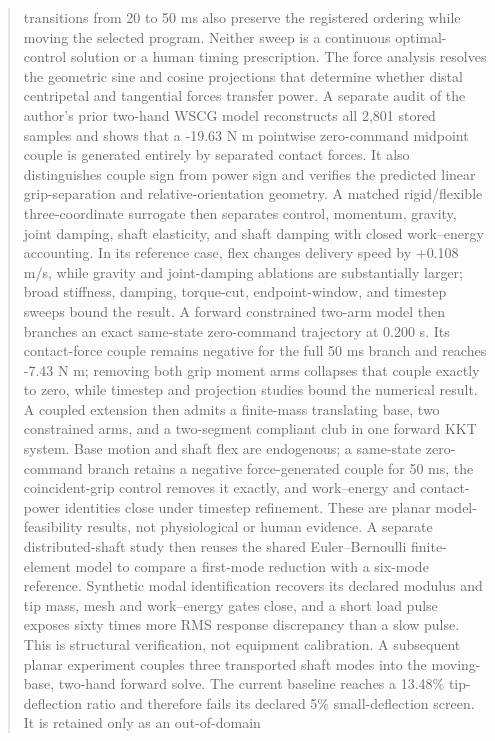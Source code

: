 \documentclass[
  letterpaper,
]{report}
\begin{document}
\begin{abstract}
transitions from 20 to 50 ms also preserve the registered ordering while
moving the selected program. Neither sweep is a continuous
optimal-control solution or a human timing prescription. The force
analysis resolves the geometric sine and cosine projections that
determine whether distal centripetal and tangential forces transfer
power. A separate audit of the author's prior two-hand WSCG model
reconstructs all 2,801 stored samples and shows that a -19.63 N m
pointwise zero-command midpoint couple is generated entirely by
separated contact forces. It also distinguishes couple sign from power
sign and verifies the predicted linear grip-separation and
relative-orientation geometry. A matched rigid/flexible three-coordinate
surrogate then separates control, momentum, gravity, joint damping,
shaft elasticity, and shaft damping with closed work--energy accounting.
In its reference case, flex changes delivery speed by +0.108 m/s, while
gravity and joint-damping ablations are substantially larger; broad
stiffness, damping, torque-cut, endpoint-window, and timestep sweeps
bound the result. A forward constrained two-arm model then branches an
exact same-state zero-command trajectory at 0.200 s. Its contact-force
couple remains negative for the full 50 ms branch and reaches -7.43 N m;
removing both grip moment arms collapses that couple exactly to zero,
while timestep and projection studies bound the numerical result. A
coupled extension then admits a finite-mass translating base, two
constrained arms, and a two-segment compliant club in one forward KKT
system. Base motion and shaft flex are endogenous; a same-state
zero-command branch retains a negative force-generated couple for 50 ms,
the coincident-grip control removes it exactly, and work--energy and
contact-power identities close under timestep refinement. These are
planar model-feasibility results, not physiological or human evidence. A
separate distributed-shaft study then reuses the shared Euler--Bernoulli
finite-element model to compare a first-mode reduction with a six-mode
reference. Synthetic modal identification recovers its declared modulus
and tip mass, mesh and work--energy gates close, and a short load pulse
exposes sixty times more RMS response discrepancy than a slow pulse.
This is structural verification, not equipment calibration. A subsequent
planar experiment couples three transported shaft modes into the
moving-base, two-hand forward solve. The current baseline reaches a
13.48\% tip-deflection ratio and therefore fails its declared 5\%
small-deflection screen. It is retained only as an out-of-domain

\end{abstract}
\end{document}
